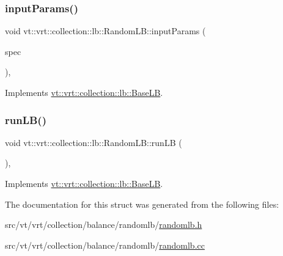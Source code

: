 \subsubsection{\texorpdfstring{input\+Params()}{inputParams()}}
{\footnotesize\ttfamily void vt\+::vrt\+::collection\+::lb\+::\+Random\+L\+B\+::input\+Params (\begin{DoxyParamCaption}\item[{\hyperlink{structvt_1_1vrt_1_1collection_1_1balance_1_1_spec_entry}{balance\+::\+Spec\+Entry} $\ast$}]{spec }\end{DoxyParamCaption})\hspace{0.3cm}{\ttfamily [override]}, {\ttfamily [virtual]}}



Implements \hyperlink{structvt_1_1vrt_1_1collection_1_1lb_1_1_base_l_b_a555e29aadfd428383464d6dd007506b6}{vt\+::vrt\+::collection\+::lb\+::\+Base\+LB}.

\mbox{\label{structvt_1_1vrt_1_1collection_1_1lb_1_1_random_l_b_a7354965590d0ab010841a2a9086ce7e8}} 
\subsubsection{\texorpdfstring{run\+L\+B()}{runLB()}}
{\footnotesize\ttfamily void vt\+::vrt\+::collection\+::lb\+::\+Random\+L\+B\+::run\+LB (\begin{DoxyParamCaption}{ }\end{DoxyParamCaption})\hspace{0.3cm}{\ttfamily [override]}, {\ttfamily [virtual]}}



Implements \hyperlink{structvt_1_1vrt_1_1collection_1_1lb_1_1_base_l_b_a69a398c54f8129f365171a1189ffcd84}{vt\+::vrt\+::collection\+::lb\+::\+Base\+LB}.



The documentation for this struct was generated from the following files\+:\begin{DoxyCompactItemize}
\item 
src/vt/vrt/collection/balance/randomlb/\hyperlink{randomlb_8h}{randomlb.\+h}\item 
src/vt/vrt/collection/balance/randomlb/\hyperlink{randomlb_8cc}{randomlb.\+cc}\end{DoxyCompactItemize}
